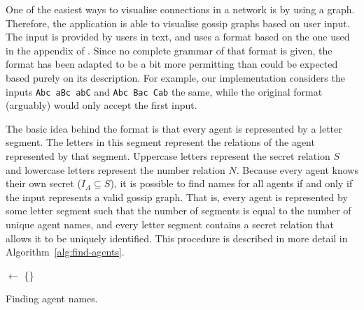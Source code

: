 One of the easiest ways to visualise connections in a network is by using a graph.
Therefore, the application is able to visualise gossip graphs based on user input.
The input is provided by users in text, and uses a format based on the one used in the appendix of \textcite{van_ditmarsch_strengthening_2019}.
Since no complete grammar of that format is given,
the format has been adapted to be a bit more permitting than could be expected based purely on its description.
For example, our implementation considers the inputs \texttt{Abc aBc abC} and \texttt{Abc Bac Cab} the same, while the original format (arguably) would only accept the first input.

The basic idea behind the format is that every agent is represented by a letter segment.
The letters in this segment represent the relations of the agent represented by that segment.
Uppercase letters represent the secret relation \(S\) and lowercase letters represent the number relation \(N\).
Because every agent knows their own secret (\(I_A \subseteq S\)), it is possible to find names for all agents if and only if the input represents a valid gossip graph.
That is, every agent is represented by some letter segment such that the number of segments is equal to the number of unique agent names, and every letter segment contains a secret relation that allows it to be uniquely identified.
This procedure is described in more detail in Algorithm~\ref{alg:find-agents}.

\begin{algorithm*}
    \DontPrintSemicolon

    \Names $\leftarrow$ \{\}\;
    \BlankLine
    \Return{\Names}\;
    \caption{Finding agent names.}\label{alg:find-agents}
\end{algorithm*}

